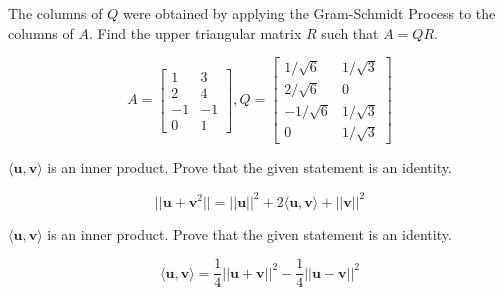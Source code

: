 \documentclass[11pt,letterpaper,boxed]{pset}
\begin{document}
    
    \begin{problem} [5.3 \#18]
    	The columns of $Q$ were obtained by applying the Gram-Schmidt Process to the columns of $A$. Find the upper triangular matrix $R$ such that $A=QR$.
    
    	\[A=\begin{bmatrix} 1  &  3 \\ 
    						2  &  4 \\
    						-1 & -1 \\
    						0  &  1
    		\end{bmatrix},
    		Q=\begin{bmatrix}   1/\sqrt 6  & 1/\sqrt 3 \\
    							2/\sqrt 6  & 0 \\
    							-1/\sqrt 6 & 1/\sqrt 3 \\
    							0          & 1/\sqrt 3
    		\end{bmatrix} \]
    
    \end{problem}
    \begin{solution}
    \vspace{\fill}
    \end{solution}
    \clearpage
    
    
    \begin{problem} [7.1 \#32]
    	$\langle \textbf{u}, \textbf{v} \rangle$ is an inner product. Prove that the given statement is an identity.
    
    	\[||\textbf{u} + \textbf{v}^2|| = ||\textbf{u}||^2
    		+ 2\langle \textbf{u}, \textbf{v} \rangle
    		+ ||\textbf{v}||^2 \]
    
    \end{problem}
    \begin{solution}
    \vspace{\fill}
    \end{solution}
    \clearpage
    
    
    \begin{problem} [7.1 \#34]
    	$\langle \textbf{u}, \textbf{v} \rangle$ is an inner product. Prove that the given statement is an identity.
    
    	\[ \langle \textbf{u}, \textbf{v} \rangle = 
    	    \frac{1}{4}||\textbf{u} + \textbf{v}||^2 
    	    - \frac{1}{4} ||\textbf{u} - \textbf{v}||^2 \]
    
    \end{problem}
    \begin{solution}
    \vspace{\fill}
    \end{solution}
    \clearpage 
    
\end{document}
